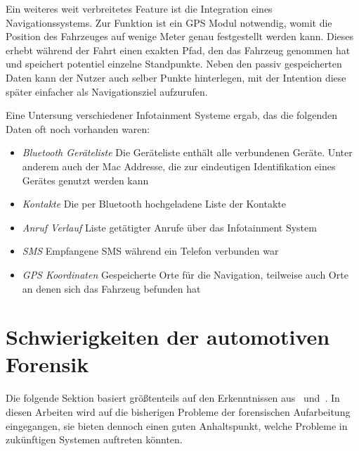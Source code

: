 \documentclass[conference,compsoc,final,a4paper]{IEEEtran}
\begin{document}
Ein weiteres weit verbreitetes Feature ist die Integration eines Navigationssystems.
Zur Funktion ist ein \ac{GPS} Modul notwendig, womit die Position des Fahrzeuges auf wenige Meter genau festgestellt werden kann.
Dieses erhebt während der Fahrt einen exakten Pfad, den das Fahrzeug genommen hat und speichert potentiel einzelne Standpunkte.
Neben den passiv gespeicherten Daten kann der Nutzer auch selber Punkte hinterlegen, mit der Intention diese später einfacher als 
Navigationsziel aufzurufen.

Eine Untersung verschiedener Infotainment Systeme ergab, das die folgenden Daten oft noch vorhanden waren:~\cite{Lacroix2017}
\begin{itemize}
  \item \emph{Bluetooth Geräteliste} Die Geräteliste enthält alle verbundenen Geräte. Unter anderem auch der Mac Addresse, die zur eindeutigen Identifikation eines Gerätes genutzt werden kann
  \item \emph{Kontakte} Die per Bluetooth hochgeladene Liste der Kontakte
  \item \emph{Anruf Verlauf} Liste getätigter Anrufe über das Infotainment System
  \item \emph{SMS} Empfangene SMS während ein Telefon verbunden war
  \item \emph{GPS Koordinaten} Gespeicherte Orte für die Navigation, teilweise auch Orte an denen sich das Fahrzeug befunden hat
\end{itemize}

\section{Schwierigkeiten der automotiven Forensik}

Die folgende Sektion basiert größtenteils auf den Erkenntnissen aus~\cite{Kopencova_2020} und~\cite{LeKhac2020}.
In diesen Arbeiten wird auf die bisherigen Probleme der forensischen Aufarbeitung eingegangen, sie bieten dennoch einen guten Anhaltspunkt,
welche Probleme in zukünftigen Systemen auftreten könnten.\\
\end{document}
